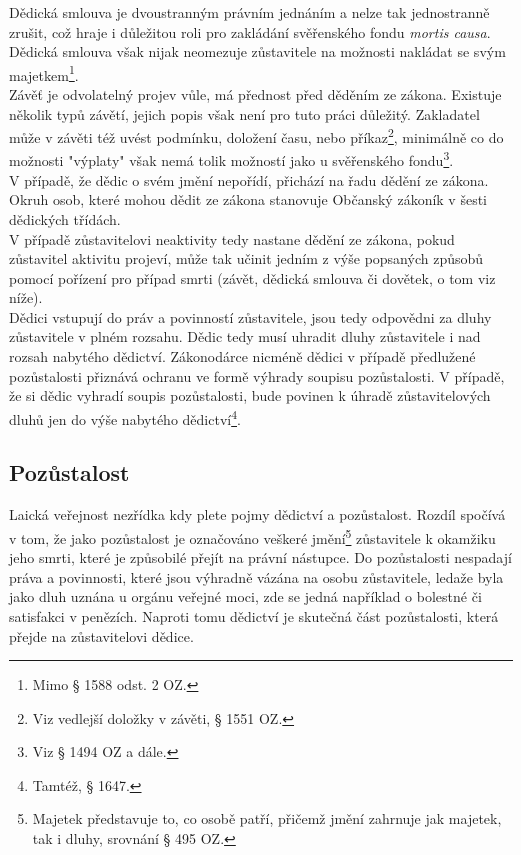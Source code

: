 \documentclass{article}
\begin{document}

Dědická smlouva je dvoustranným právním jednáním a nelze tak jednostranně zrušit, což hraje i důležitou roli pro zakládání svěřenského fondu \textit{mortis causa}. Dědická smlouva však nijak neomezuje zůstavitele na možnosti nakládat se svým majetkem\footnote{Mimo § 1588 odst. 2 OZ.}.\\

Závěť je odvolatelný projev vůle, má přednost před děděním ze zákona. Existuje několik typů závětí, jejich popis však není pro tuto práci důležitý. Zakladatel může v závěti též uvést podmínku, doložení času, nebo příkaz\footnote{Viz vedlejší doložky v závěti, § 1551 OZ.}, minimálně co do možnosti "výplaty" však nemá tolik možností jako u svěřenského fondu\footnote{Viz § 1494 OZ a dále.}.\\

V případě, že dědic o svém jmění nepořídí, přichází na řadu dědění ze zákona. Okruh osob, které mohou dědit ze zákona stanovuje Občanský zákoník v šesti dědických třídách.\\

V případě zůstavitelovi neaktivity tedy nastane dědění ze zákona, pokud zůstavitel aktivitu projeví, může tak učinit jedním z výše popsaných způsobů pomocí pořízení pro případ smrti (závět, dědická smlouva či dovětek, o tom viz níže).\\

Dědici vstupují do práv a povinností zůstavitele, jsou tedy odpovědni za dluhy zůstavitele v plném rozsahu. Dědic tedy musí uhradit dluhy zůstavitele i nad rozsah nabytého dědictví. Zákonodárce nicméně dědici v případě předlužené pozůstalosti přiznává ochranu ve formě výhrady soupisu pozůstalosti. V případě, že si dědic vyhradí soupis pozůstalosti, bude povinen k úhradě zůstavitelových dluhů jen do výše nabytého dědictví\footnote{Tamtéž, § 1647.}.

\subsection{Pozůstalost}

Laická veřejnost nezřídka kdy plete pojmy dědictví a pozůstalost. Rozdíl spočívá v tom, že jako pozůstalost je označováno veškeré jmění\footnote{Majetek představuje to, co osobě patří, přičemž jmění zahrnuje jak majetek, tak i dluhy, srovnání § 495 OZ.} zůstavitele k okamžiku jeho smrti, které je způsobilé přejít na právní nástupce. Do pozůstalosti nespadají práva a povinnosti, které jsou výhradně vázána na osobu zůstavitele, ledaže byla jako dluh uznána u orgánu veřejné moci, zde se jedná například o bolestné či satisfakci v penězích. Naproti tomu dědictví je skutečná část pozůstalosti, která přejde na zůstavitelovi dědice.\\
\end{document}
